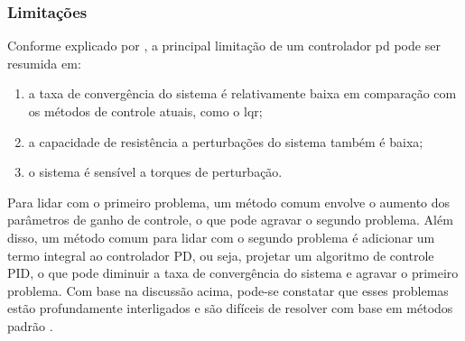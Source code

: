 \subsubsection{Limitações}

Conforme explicado por \cite{qi2022variable}, a principal limitação de um controlador \gls{pd} pode ser resumida em:
 
\begin{enumerate}[label=(\roman*)]
  \item a taxa de convergência do sistema é relativamente baixa em comparação com os métodos de controle atuais, como o \gls{lqr};
  \item a capacidade de resistência a perturbações do sistema também é baixa;
  \item o sistema é sensível a torques de perturbação.
\end{enumerate}

Para lidar com o primeiro problema, um método comum envolve o aumento dos parâmetros de ganho de controle, o que pode agravar o segundo problema.
Além disso, um método comum para lidar com o segundo problema é adicionar um termo integral ao controlador PD, ou seja, projetar um algoritmo de controle PID, o que pode diminuir a taxa de convergência do sistema e agravar o primeiro problema.
Com base na discussão acima, pode-se constatar que esses problemas estão profundamente interligados e são difíceis de resolver com base em métodos padrão \cite{qi2022variable}.
